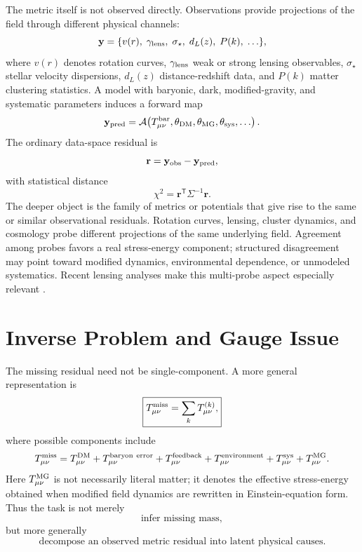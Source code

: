 \documentclass[10pt]{article}
\newcommand{\Tmiss}{T^{\rm miss}_{\mu\nu}}
\begin{document}
The metric itself is not observed directly. Observations provide projections of the field through different physical channels:
\begin{equation}
\mathbf{y}
=
\{v(r),\;\gamma_{\rm lens},\;\sigma_\star,\;d_L(z),\;P(k),\;\ldots\},
\end{equation}
where $v(r)$ denotes rotation curves, $\gamma_{\rm lens}$ weak or strong lensing observables, $\sigma_\star$ stellar velocity dispersions, $d_L(z)$ distance-redshift data, and $P(k)$ matter clustering statistics. A model with baryonic, dark, modified-gravity, and systematic parameters induces a forward map
\begin{equation}
\mathbf{y}_{\rm pred}
=
{\cal A}\!\left(
T^{\rm bar}_{\mu\nu},
\theta_{\rm DM},
\theta_{\rm MG},
\theta_{\rm sys},
\ldots
\right).
\end{equation}
The ordinary data-space residual is
\begin{equation}
\mathbf{r}
=
\mathbf{y}_{\rm obs}-\mathbf{y}_{\rm pred},
\end{equation}
with statistical distance
\begin{equation}
\chi^2
=
\mathbf{r}^{\mathsf T}\Sigma^{-1}\mathbf{r}.
\end{equation}
The deeper object is the family of metrics or potentials that give rise to the same or similar observational residuals. Rotation curves, lensing, cluster dynamics, and cosmology probe different projections of the same underlying field. Agreement among probes favors a real stress-energy component; structured disagreement may point toward modified dynamics, environmental dependence, or unmodeled systematics. Recent lensing analyses make this multi-probe aspect especially relevant \citep{Mistele2024}.

\section{Inverse Problem and Gauge Issue}

The missing residual need not be single-component. A more general representation is
\begin{equation}
\boxed{
\Tmiss=\sum_k T^{(k)}_{\mu\nu},
}
\end{equation}
where possible components include
\begin{equation}
\Tmiss
=
T^{\rm DM}_{\mu\nu}
+T^{\rm baryon\ error}_{\mu\nu}
+T^{\rm feedback}_{\mu\nu}
+T^{\rm environment}_{\mu\nu}
+T^{\rm sys}_{\mu\nu}
+T^{\rm MG}_{\mu\nu}.
\end{equation}
Here $T^{\rm MG}_{\mu\nu}$ is not necessarily literal matter; it denotes the effective stress-energy obtained when modified field dynamics are rewritten in Einstein-equation form. Thus the task is not merely
\begin{equation}
\text{infer missing mass},
\end{equation}
but more generally
\begin{equation}
\text{decompose an observed metric residual into latent physical causes}.
\end{equation}
\end{document}
